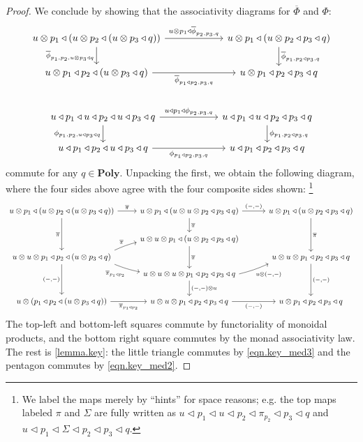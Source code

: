 \documentclass[11pt, one side, article]{memoir}
\theoremstyle{definition}
\theoremstyle{plain}
\newcommand{\Cat}[1]{\mathbf{#1}}%
\newcommand{\ol}[1]{\overline{#1}}
\newcommand{\poly}{\Cat{Poly}}
\newcommand{\0}{\textsf{0}}
\newcommand{\1}{\tn{\textsf{1}}}
\newcommand{\tri}{\mathbin{\triangleleft}}
\newcommand{\switch}{\pi}
\begin{document}
\begin{proof}
We conclude by showing that the associativity diagrams for $\ol\Phi$ and $\Phi$:
\begin{gather*}
\begin{tikzcd}[ampersand replacement=\&, column sep=60pt]
	u\otimes p_1\tri(u\otimes p_2\tri(u\otimes p_3\tri q))
		\ar[r, "u\otimes p_1\tri\ol\phi_{p_2,p_3,q}"]
		\ar[d, "\ol\phi_{p_1,p_2,u\otimes p_3\tri q}"']\&
	u\otimes p_1\tri(u\otimes p_2\tri p_3\tri q)
		\ar[d, "\ol\phi_{p_1,p_2\tri p_3,q}"]\\
	u\otimes p_1\tri p_2\tri(u\otimes p_3\tri q)
		\ar[r, "\ol\phi_{p_1\tri p_2,p_3,q}"']\&
	u\otimes p_1\tri p_2\tri p_3\tri q
\end{tikzcd}
\\[15pt]
\begin{tikzcd}[ampersand replacement=\&, column sep=60pt]
	u\tri p_1\tri u\tri p_2\tri u\tri p_3\tri q
		\ar[r, "u\tri p_1\tri\phi_{p_2,p_3,q}"]
		\ar[d, "\phi_{p_1,p_2,u\tri p_3\tri q}"']\&
	u\tri p_1\tri u\tri p_2\tri p_3\tri q
		\ar[d, "\phi_{p_1,p_2\tri p_3,q}"]\\
	u\tri p_1\tri p_2\tri u\tri p_3\tri q
		\ar[r, "\phi_{p_1\tri p_2,p_3,q}"']\&
	u\tri p_1\tri p_2\tri p_3\tri q
\end{tikzcd}
\end{gather*}
commute for any $q\in\poly$. Unpacking the first, we obtain the following diagram, where the four sides above agree with the four composite sides shown:%
\footnote{We label the maps merely by ``hints'' for space reasons; e.g. the top maps labeled $\switch$ and $\Sigma$ are fully written as $u\tri p_1\tri u\tri p_2\tri\switch_{p_2}\tri p_3\tri q$ and $u\tri p_1\tri\Sigma\tri p_2\tri p_3\tri q$.}
\[\fontsize{9.6pt}{9.6pt}\selectfont
\begin{tikzcd}
	u\otimes p_1\tri(u\otimes p_2\tri(u\otimes p_3\tri q))\ar[r, "\ol{\pi}"]\ar[dd, "\ol{\pi}"']&
	u\otimes p_1\tri(u\otimes u\otimes p_2\tri p_3\tri q)\ar[r, "{(-,-)}"]\ar[d, "\ol{\pi}"]&[5pt]
	u\otimes p_1\tri(u\otimes p_2\tri p_3\tri q)\ar[dd, "\ol{\pi}"]\\&
	u\otimes u\otimes p_1\tri(u\otimes p_2\tri p_3\tri q)\ar[dd, "\ol{\pi}"]\\[-12pt]
	u\otimes u\otimes p_1\tri p_2\tri(u\otimes p_3\tri q)\ar[dd, "{(-,-)}"']\ar[ur, bend left=5pt, start anchor={north east}, "\ol{\pi}"]\ar[dr, bend right=5pt, start anchor={south east}, "\ol{\pi}_{p_1\tri p_2}"']&&
	u\otimes u\otimes p_1\tri p_2\tri p_3\tri q\ar[dd, "{(-,-)}"]\\[-12pt]&
	u\otimes u\otimes u\otimes p_1\tri p_2\tri p_3\tri q\ar[d, "{(-,-)}\otimes u"]\ar[ur, bend right=5pt, start anchor={east}, end anchor={south west}, "u\otimes{(-,-)}"']\\
	u\otimes(p_1\tri p_2\tri(u\otimes p_3\tri q))\ar[r, "\ol{\pi}_{p_1\tri p_2}"']&
	u\otimes u\otimes p_1\tri p_2\tri p_3\tri q\ar[r, "{(-,-)}"']&
	u\otimes p_1\tri p_2\tri p_3\tri q
\end{tikzcd}
\]
The top-left and bottom-left squares commute by functoriality of monoidal products, and the bottom right square commutes by the monad associativity law. The rest is \cref{lemma.key}: the little triangle commutes by \eqref{eqn.key_med3} and the pentagon commutes by \eqref{eqn.key_med2}.


\end{proof}
\end{document}
